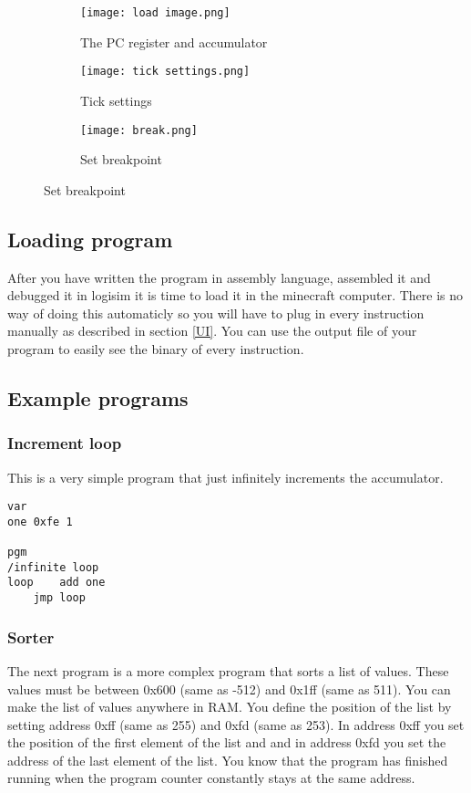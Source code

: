 \documentclass{article}
\begin{document}
\begin{figure}[h]
	\centering
	\begin{subfigure}{0.2\textwidth}
		\centering
		\texttt{[image: load image.png]}
		\caption{The PC register and accumulator\label{PC}}
	\end{subfigure}\hfill
	\begin{subfigure}{0.1\textwidth}
		\centering
		\texttt{[image: tick settings.png]}
		\caption{Tick settings}
	\end{subfigure}
	\begin{subfigure}{0.6\textwidth}
		\centering
		\texttt{[image: break.png]}
		\caption{Set breakpoint\label{break}}
	\end{subfigure}
\end{figure}
\subsection{Loading program\label{Loading in}}
After you have written the program in assembly language, assembled it and debugged it in logisim it is time to load it in the minecraft computer. There is no way of doing this automaticly so you will have to plug in every instruction manually as described in section \ref{UI}. You can use the output file of your program to easily see the binary of every instruction.
\subsection{Example programs}
\subsubsection{Increment loop}
This is a very simple program that just infinitely increments the accumulator.
\begin{lstlisting}
var
one 0xfe 1

pgm
/infinite loop
loop	add one
	jmp loop
\end{lstlisting}
\subsubsection{Sorter\label{Round}}
The next program is a more complex program that sorts a list of values. These values must be between 0x600 (same as -512) and 0x1ff (same as 511). You can make the list of values anywhere in RAM. You define the position of the list by setting address 0xff (same as 255) and 0xfd (same as 253). In address 0xff you set the position of the first element of the list and and in address 0xfd you set the address of the last element of the list. You know that the program has finished running when the program counter constantly stays at the same address.
\end{document}
